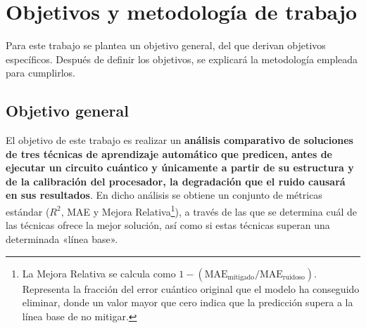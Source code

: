 \chapter{Objetivos y metodología de trabajo}
\label{cap:objetivos}

%
%
%
%

Para este trabajo se plantea un objetivo general, del que derivan objetivos
específicos. Después de definir los objetivos, se explicará la metodología empleada para cumplirlos.

\section{Objetivo general}
\label{sec:objetivo_general}

El objetivo de este trabajo es realizar un \textbf{análisis comparativo de soluciones de tres técnicas de aprendizaje automático que predicen, antes de ejecutar un circuito cuántico y únicamente a partir de su estructura y de la calibración del procesador, la degradación que el ruido causará en sus resultados}. En dicho análisis se obtiene un conjunto de métricas estándar ($R^2$, MAE y Mejora Relativa\footnote{La Mejora Relativa se calcula como $1 - (\text{MAE}_{\text{mitigado}} / \text{MAE}_{\text{ruidoso}})$. Representa la fracción del error cuántico original que el modelo ha conseguido eliminar, donde un valor mayor que cero indica que la predicción supera a la línea base de no mitigar.}), a través de las que se determina cuál de las técnicas ofrece la mejor solución, así como si estas técnicas superan una determinada «línea base».

